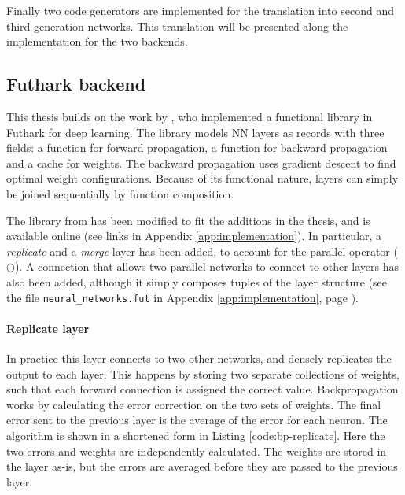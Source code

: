 Finally two code generators are implemented for the translation into
second and third generation networks.
This translation will be presented along the implementation
for the two backends.

\subsection{Futhark backend} \label{sec:volr-futhark}
This thesis builds on the work by \textcite{Minh2018}, who 
implemented a functional library in Futhark for deep learning.
The library models \gls{NN} layers as records with three fields:
a function for forward propagation, a function for backward propagation
and a cache for weights. 
The backward propagation uses gradient descent to find optimal
weight configurations.
Because of its functional nature, layers can simply be joined 
sequentially by function composition.

The library from \cite{Minh2018} has been modified to fit the
additions in the thesis, and is available online (see links in 
Appendix \ref{app:implementation}).
In particular, a \textit{replicate} and a \textit{merge} layer has
been added, to account for the parallel operator ($\ominus$).
A connection that allows two parallel networks to connect to other
layers has also been added, although it simply composes tuples of
the layer structure (see the file \texttt{neural\_networks.fut} in
Appendix \ref{app:implementation}, page \pageref{app:implementation_fut_nn}).

\paragraph{Replicate layer}
In practice this layer connects to two other networks, and densely
replicates the output to each layer.
This happens by storing two separate collections of weights, such
that each forward connection is assigned the correct value.
Backpropagation works by calculating the error correction on the
two sets of weights. The final error sent to the previous layer
is the average of the error for each neuron. 
The algorithm is shown in a shortened form in Listing \ref{code:bp-replicate}.
Here the two errors and weights are independently calculated.
The weights are stored in the layer as-is, but the errors are 
averaged before they are passed to the previous layer.

